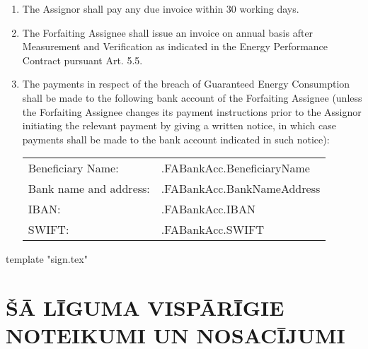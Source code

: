 \documentclass[a4paper]{article}
\begin{document}
\begin{enumerate}
\item{The Assignor shall pay any due invoice within 30 working days.}

\item{The Forfaiting Assignee shall issue an invoice on annual basis
    after Measurement and Verification as indicated in the Energy
    Performance Contract pursuant Art. 5.5.}

\item{The payments in respect of the breach of Guaranteed Energy
    Consumption shall be made to the following bank account of the
    Forfaiting Assignee (unless the Forfaiting Assignee changes its
    payment instructions prior to the Assignor initiating the relevant
    payment by giving a written notice, in which case payments shall
    be made to the bank account indicated in such notice):

    \begin{tabu}{XX[2]}
      Beneficiary Name: 	& 	{{.FABankAcc.BeneficiaryName}} 	\\
      Bank name and address: 	& 	{{.FABankAcc.BankNameAddress}} 	\\
      IBAN:			& 	{{.FABankAcc.IBAN}} 		\\
      SWIFT:			& 	{{.FABankAcc.SWIFT}} 		\\
    \end{tabu}}

\end{enumerate}

{{template "sign.tex"}}

\section{ŠĀ LĪGUMA VISPĀRĪGIE NOTEIKUMI UN NOSACĪJUMI}
\end{document}
